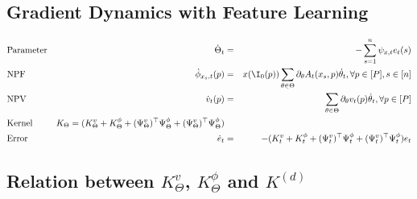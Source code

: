 \subsection{Gradient Dynamics with Feature Learning}
\begin{align}
&\text{Parameter}&\dot{\Theta}_t&=&-\sum_{s=1}^n \psi_{x,t}e_t(s)\\
&\text{NPF}              &\dot{\phi}_{x_s,t}(p)&=&x(\I_0(p))\sum_{\theta\in\Theta}\partial_{\theta}A_t(x_s,p)\dot{\theta}_t,\forall p\in[P], s\in[n]\\
&\text{NPV}              &\dot{v}_t(p)&=&\sum_{\theta\in\Theta}\partial_{\theta}v_t(p)\dot{\theta}_t,\forall p\in[P]\\
&\text{Kernel}              &K_{\Theta}=(K^v_{\Theta}+K^{\phi}_{\Theta}+(\Psi^v_{\Theta})^\top \Psi^{\phi}_{\Theta}+(\Psi^v_{\Theta})^\top\Psi^{\phi}_{\Theta})\\
&\text{Error}     &\dot{e}_t&=&-(K^v_t+K^{\phi}_t+(\Psi^v_{t})^\top \Psi^{\phi}_{t}+(\Psi^v_{t})^\top\Psi^{\phi}_{t})e_t
\end{align}
\subsection{Relation between $K^v_{\Theta}$, $K^{\phi}_{\Theta}$ and $K^{(d)}$ }
